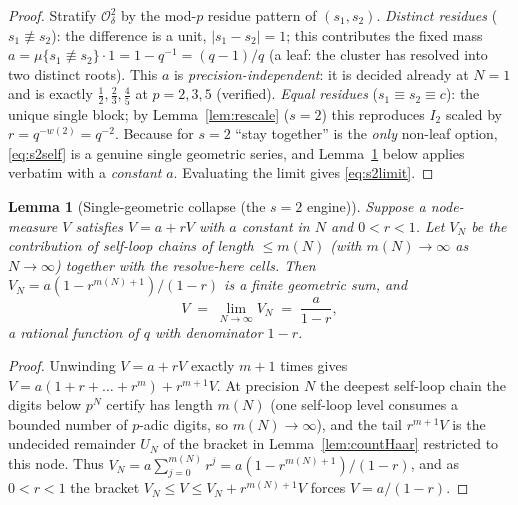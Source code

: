 \documentclass[11pt]{article}
\newtheorem{lemma}[theorem]{Lemma}
\theoremstyle{definition}
\theoremstyle{remark}
\newcommand{\Odelta}{\mathcal{O}_\delta}
\begin{document}
\begin{proof}
Stratify $\Odelta^2$ by the mod-$p$ residue pattern of $(s_1,s_2)$.
\emph{Distinct residues} ($s_1\not\equiv s_2$): the difference is a unit,
$|s_1-s_2|=1$; this contributes the fixed mass $a=\mu\{s_1\not\equiv s_2\}\cdot1
=1-q^{-1}=(q-1)/q$ (a leaf: the cluster has resolved into two distinct roots). This
$a$ is \emph{precision-independent}: it is decided already at $N=1$ and is exactly
$\tfrac12,\tfrac23,\tfrac45$ at $p=2,3,5$ (verified). \emph{Equal residues}
($s_1\equiv s_2\equiv c$): the unique single block; by Lemma~\ref{lem:rescale}
($s=2$) this reproduces $I_2$ scaled by $r=q^{-w(2)}=q^{-2}$. Because for $s=2$
``stay together'' is the \emph{only} non-leaf option, \eqref{eq:s2self} is a genuine
single geometric series, and Lemma~\ref{lem:collapse} below applies verbatim with a
\emph{constant} $a$. Evaluating the limit gives \eqref{eq:s2limit}.
\end{proof}

\begin{lemma}[Single-geometric collapse (the $s=2$ engine)]\label{lem:collapse}
Suppose a node-measure $V$ satisfies $V=a+rV$ with $a$ \emph{constant in $N$} and
$0<r<1$. Let $V_N$ be the contribution of self-loop chains of length $\le m(N)$
(with $m(N)\to\infty$ as $N\to\infty$) together with the resolve-here cells. Then
$V_N=a(1-r^{m(N)+1})/(1-r)$ is a finite geometric sum, and
\begin{equation}\label{eq:limit}
  V \;=\; \lim_{N\to\infty} V_N \;=\; \frac{a}{1-r},
\end{equation}
a rational function of $q$ with denominator $1-r$.
\end{lemma}

\begin{proof}
Unwinding $V=a+rV$ exactly $m+1$ times gives
$V=a(1+r+\dots+r^{m})+r^{m+1}V$. At precision $N$ the deepest self-loop chain the
digits below $p^N$ certify has length $m(N)$ (one self-loop level consumes a bounded
number of $p$-adic digits, so $m(N)\to\infty$), and the tail $r^{m+1}V$ is the
undecided remainder $U_N$ of the bracket in Lemma~\ref{lem:countHaar} restricted to
this node. Thus $V_N=a\sum_{j=0}^{m(N)}r^j=a(1-r^{m(N)+1})/(1-r)$, and as $0<r<1$
the bracket $V_N\le V\le V_N+r^{m(N)+1}V$ forces $V=a/(1-r)$.
\end{proof}
\end{document}
